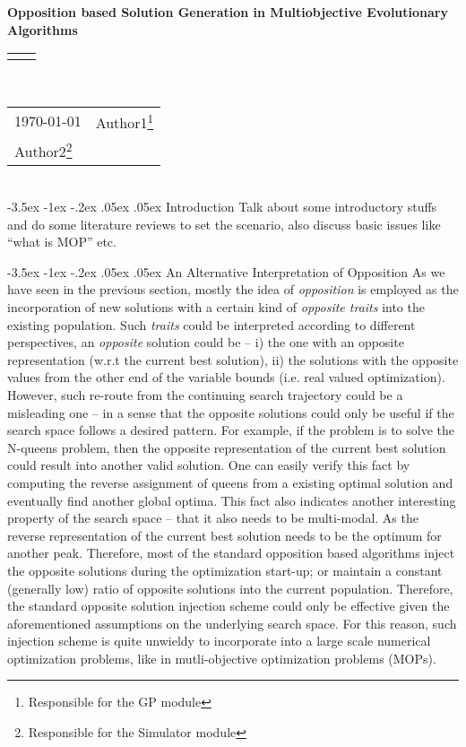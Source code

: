 \documentclass[11pt]{article}
\makeatletter
\renewcommand{\title}[1]{\textbf{#1}\\}
\renewcommand{\line}{\begin{tabularx}{\textwidth}{X>{\raggedleft}X}\hline\\\end{tabularx}\\[-0.4cm]}
\newcommand{\leftright}[2]{\begin{tabularx}{\textwidth}{X>{\raggedleft}X}#1%
& #2\\\end{tabularx}\\[-0.5cm]}
\renewcommand\section{\@startsection{section}{1}{\z@}%
                                  {-3.5ex \@plus -1ex \@minus -.2ex}%
                                  {.05ex \@plus.05ex}%
                                  {\normalfont\large\bf}}
\makeatother
\begin{document}
\title{Opposition based Solution Generation in Multiobjective Evolutionary Algorithms}
\line
\leftright{\today}{Author1\footnote{Responsible for the GP module}\\Author2\footnote{Responsible for the Simulator module}} %

\section{Introduction}
Talk about some introductory stuffs and do some literature reviews to set the scenario, also discuss basic issues like ``what is MOP'' etc. 

\section{An Alternative Interpretation of Opposition}
As we have seen in the previous section, mostly the idea of \textit{opposition} is employed as the incorporation of new solutions with a certain kind of \textit{opposite traits} into the existing population. Such \textit{traits} could be interpreted according to different perspectives, an \textit{opposite} solution could be -- i) the one with an opposite representation (w.r.t the current best solution), ii) the solutions with the opposite values from the other end of the variable bounds (i.e. real valued optimization). However, such re-route from the continuing search trajectory could be a misleading one -- in a sense that the opposite solutions could only be useful if the search space follows a desired pattern. For example, if the problem is to solve the N-queens problem, then the opposite representation of the current best solution could result into another valid solution. One can easily verify this fact by computing the reverse assignment of queens from a existing optimal solution and eventually find another global optima. This fact also indicates another interesting property of the search space -- that it also needs to be multi-modal. As the reverse representation of the current best solution needs to be the optimum for another peak. Therefore, most of the standard opposition based algorithms inject the opposite solutions during the optimization start-up; or maintain a constant (generally low) ratio of opposite solutions into the current population. Therefore, the standard opposite solution injection scheme could only be effective given the aforementioned assumptions on the underlying search space. For this reason, such injection scheme is quite unwieldy to incorporate into a large scale numerical optimization problems, like in mutli-objective optimization problems (MOPs).
\end{document}
